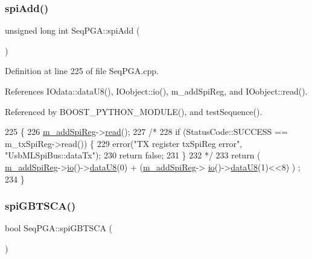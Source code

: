 \subsubsection{\texorpdfstring{spi\+Add()}{spiAdd()}}
{\footnotesize\ttfamily unsigned long int Seq\+P\+G\+A\+::spi\+Add (\begin{DoxyParamCaption}{ }\end{DoxyParamCaption})}



Definition at line 225 of file Seq\+P\+G\+A.\+cpp.



References I\+Odata\+::data\+U8(), I\+Oobject\+::io(), m\+\_\+add\+Spi\+Reg, and I\+Oobject\+::read().



Referenced by B\+O\+O\+S\+T\+\_\+\+P\+Y\+T\+H\+O\+N\+\_\+\+M\+O\+D\+U\+L\+E(), and test\+Sequence().


\begin{DoxyCode}
225                                 \{
226   \hyperlink{classSeqPGA_af31d87ad56c501584ccb9c60776a1289}{m\_addSpiReg}->\hyperlink{classIOobject_aa07610c11963b1db6710e3c76ceea456}{read}();
227   \textcolor{comment}{/*}
228 \textcolor{comment}{    if (StatusCode::SUCCESS == m\_txSpiReg->read()) \{}
229 \textcolor{comment}{    error("TX register txSpiReg error", "UsbMLSpiBus::dataTx");}
230 \textcolor{comment}{    return false;}
231 \textcolor{comment}{    \}}
232 \textcolor{comment}{  */}
233   \textcolor{keywordflow}{return} ( \hyperlink{classSeqPGA_af31d87ad56c501584ccb9c60776a1289}{m\_addSpiReg}->\hyperlink{classIOobject_af04fb94137c3d86849f478ac5afab5d1}{io}()->\hyperlink{classIOdata_a75e9c318dbac3a39402179070943d4bc}{dataU8}(0) + (\hyperlink{classSeqPGA_af31d87ad56c501584ccb9c60776a1289}{m\_addSpiReg}->
      \hyperlink{classIOobject_af04fb94137c3d86849f478ac5afab5d1}{io}()->\hyperlink{classIOdata_a75e9c318dbac3a39402179070943d4bc}{dataU8}(1)<<8) ) ;
234 \}
\end{DoxyCode}
\mbox{\label{classSeqPGA_a2eadc7868d61ff79ea566b3fbfd977a5}} 
\subsubsection{\texorpdfstring{spi\+G\+B\+T\+S\+C\+A()}{spiGBTSCA()}}
{\footnotesize\ttfamily bool Seq\+P\+G\+A\+::spi\+G\+B\+T\+S\+CA (\begin{DoxyParamCaption}{ }\end{DoxyParamCaption})}




